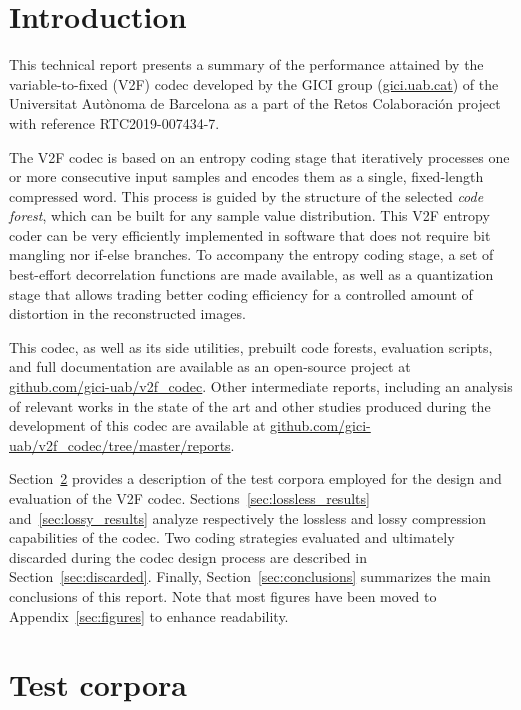\documentclass{class/technicalReportUAB}
\begin{document}
\coverpage

\newpage

\section{Introduction}

This technical report presents a summary of the performance attained by the variable-to-fixed (V2F) codec developed
by the GICI group (\url{gici.uab.cat}) of the Universitat Autònoma de Barcelona 
as a part of the Retos Colaboración project with reference RTC2019-007434-7.

The V2F codec is based on an entropy coding stage that iteratively processes one or more consecutive input samples and encodes them as a 
single, fixed-length compressed word. This process is guided by the structure of the selected \textit{code forest}, which can be 
built for any sample value distribution.
This V2F entropy coder can be very efficiently implemented in software that does not require bit mangling nor if-else branches.
To accompany the entropy coding stage, a set of best-effort decorrelation functions are made available, as well as a quantization stage that allows
trading better coding efficiency for a controlled amount of distortion in the reconstructed images.

This codec, as well as its side utilities, prebuilt code forests, evaluation scripts, and full documentation
are available as an open-source project at \mbox{\url{github.com/gici-uab/v2f_codec}}.
% 
Other intermediate reports, including an analysis of relevant works in the state of the art and other studies
produced during the development of this codec are available at \mbox{\url{github.com/gici-uab/v2f_codec/tree/master/reports}}.

Section~\ref{sec:test_corpora} provides a description of the test corpora employed for the design and evaluation of the V2F codec.
Sections~\ref{sec:lossless_results} and~\ref{sec:lossy_results} analyze respectively the lossless and lossy compression capabilities 
of the codec. Two coding strategies evaluated and ultimately discarded during the codec design process are described in Section~\ref{sec:discarded}.
Finally, Section~\ref{sec:conclusions} summarizes the main conclusions of this report. Note that most figures have been moved 
to Appendix~\ref{sec:figures} to enhance readability.


\section{Test corpora}\label{sec:test_corpora}
\end{document}
